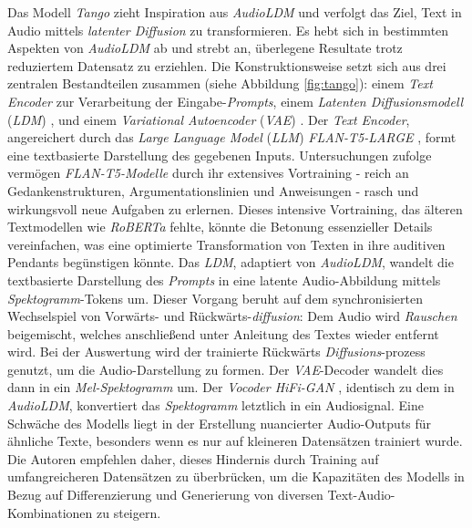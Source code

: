 \documentclass[
  a4paper,  %
  twoside,  %
  bibliography=totoc,
  headsepline,
  cleardoublepage=empty,
  parskip=half,
  draft=false
]{scrbook}
\begin{document}
Das Modell \emph{Tango} \cite{ghosal_text--audio_2023} zieht Inspiration aus \emph{AudioLDM} und verfolgt das Ziel, Text in Audio mittels \emph{latenter Diffusion} zu transformieren. Es hebt sich in bestimmten Aspekten von \emph{AudioLDM} ab und strebt an, überlegene Resultate trotz reduziertem Datensatz zu erziehlen. Die Konstruktionsweise setzt sich aus drei zentralen Bestandteilen zusammen (siehe Abbildung \ref{fig:tango}): einem \emph{Text Encoder} zur Verarbeitung der Eingabe-\emph{Prompts}, einem \emph{Latenten Diffusionsmodell} (\emph{LDM}) \cite{rombach_high-resolution_2022}, und einem \emph{Variational Autoencoder} (\emph{VAE}) \cite{kingma_auto-encoding_2022}. Der \emph{Text Encoder}, angereichert durch das \emph{Large Language Model} (\emph{LLM}) \emph{FLAN-T5-LARGE} \cite{chung_scaling_2022}, formt eine textbasierte Darstellung des gegebenen Inputs. Untersuchungen \cite{dai_why_2023} zufolge vermögen \emph{FLAN-T5-Modelle} durch ihr extensives Vortraining - reich an Gedankenstrukturen, Argumentationslinien und Anweisungen - rasch und wirkungsvoll neue Aufgaben zu erlernen. Dieses intensive Vortraining, das älteren Textmodellen wie \emph{RoBERTa} \cite{liu_roberta_2019} fehlte, könnte die Betonung essenzieller Details vereinfachen, was eine optimierte Transformation von Texten in ihre auditiven Pendants begünstigen könnte. Das \emph{LDM}, adaptiert von \emph{AudioLDM}, wandelt die textbasierte Darstellung des \emph{Prompts} in eine latente Audio-Abbildung mittels \emph{Spektogramm}-Tokens um. Dieser Vorgang beruht auf dem synchronisierten Wechselspiel von Vorwärts- und Rückwärts-\emph{diffusion}: Dem Audio wird \emph{Rauschen} beigemischt, welches anschließend unter Anleitung des Textes wieder entfernt wird. Bei der Auswertung wird der trainierte Rückwärts \emph{Diffusions}-prozess genutzt, um die Audio-Darstellung zu formen. Der \emph{VAE}-Decoder wandelt dies dann in ein \emph{Mel-Spektogramm} um. Der \emph{Vocoder HiFi-GAN} \cite{kong_hifi-gan_2020}, identisch zu dem in \emph{AudioLDM}, konvertiert das \emph{Spektogramm} letztlich in ein Audiosignal. Eine Schwäche des Modells liegt in der Erstellung nuancierter Audio-Outputs für ähnliche Texte, besonders wenn es nur auf kleineren Datensätzen trainiert wurde. Die Autoren empfehlen daher, dieses Hindernis durch Training auf umfangreicheren Datensätzen zu überbrücken, um die Kapazitäten des Modells in Bezug auf Differenzierung und Generierung von diversen Text-Audio-Kombinationen zu steigern. \cite{ghosal_text--audio_2023}
\end{document}
